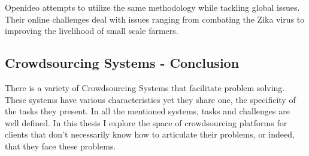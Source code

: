 Openideo\cite{openideo} attempts to utilize the same methodology while tackling global issues.  Their online challenges deal with issues ranging from combating the Zika virus to improving the livelihood of small scale farmers. 

\subsection{Crowdsourcing Systems - Conclusion}

There is a variety of Crowdsourcing Systems that facilitate problem solving. These systems have various characteristics yet they share one, the specificity of the tasks they present. In all the mentioned systems, tasks and challenges are well defined. In this thesis I explore the space of crowdsourcing platforms for clients that don’t necessarily know how to articulate their problems, or indeed, that they face these problems.

